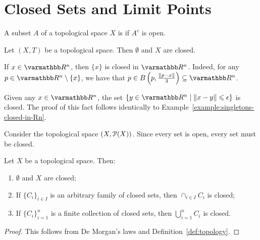 \section{Closed Sets and Limit Points}

\begin{definition}
    A subset $A$ of a topological space $X$ is  if $A^c$ is open.
\end{definition}

\begin{example}
    Let $(X,T)$ be a topological space. Then $\emptyset$ and $X$ are closed.
\end{example}

\begin{example}\label{example:singletons-closed-in-Rn}
    If $x \in \bfR^n$, then $\{x\}$ is closed in $\bfR^n$. Indeed, for any $p \in \bfR^n \setminus \{x\}$, we have that $p \in B \left( p , \frac{\lnorm p - x \rnorm}{3} \right) \subseteq \bfR^n$.
\end{example}

\begin{example}
    Given any $x \in \bfR^n$, the set $\{y \in \bfR^n \mid \lnorm x - y \rnorm \leq \epsilon\}$ is closed. The proof of this fact follows identically to Example~\ref{example:singletons-closed-in-Rn}.
\end{example}

\begin{example}
    Consider the topological space $(X,\mathcal{P}(X))$. Since every set is open, every set must be closed.
\end{example}

\begin{proposition}
    Let $X$ be a topological space. Then:
    \begin{enumerate}[label = (\arabic*),itemsep=1pt,topsep=3pt]
        \item $\emptyset$ and $X$ are closed;
        \item If $\{C_i\}_{i \in I}$ is an arbitrary family of closed sets, then $\cap_{i \in I}C_i$ is closed;
        \item If $\{C_i\}_{i =1}^n$ is a finite collection of closed sets, then $\bigcup_{i = 1}^n C_i$ is closed.
    \end{enumerate}
\end{proposition}
    \begin{proof}
        This follows from De Morgan's laws and Definition~\ref{def:topology}.
    \end{proof}

